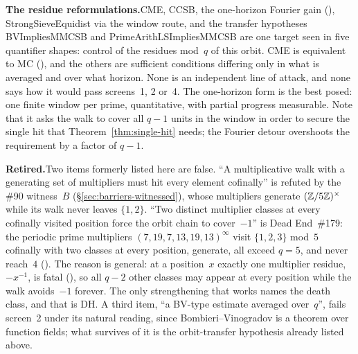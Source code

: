 \begin{frontierbox}[title={\sffamily\bfseries The ladder, and what a route must pass}]
\smallskip
\textbf{The residue reformulations.}\enspace CME, CCSB, the one-horizon
Fourier gain
(),
StrongSieveEquidist via the window route, and the transfer hypotheses
BVImpliesMMCSB and PrimeArithLSImpliesMMCSB are one target seen in five
quantifier shapes: control of the residues mod~$q$ of this orbit.  CME
is equivalent to MC (), and
the others are sufficient conditions differing only in what is averaged
and over what horizon.  None is an independent line of attack, and none
says how it would pass screens~1, 2 or~4.  The one-horizon form is the
best posed: one finite window per prime, quantitative, with partial
progress measurable.  Note that it asks the walk to cover all $q-1$
units in the window in order to secure the single hit that
Theorem~\ref{thm:single-hit} needs; the Fourier detour overshoots the
requirement by a factor of $q-1$.

\smallskip
\textbf{Retired.}\enspace Two items formerly listed here are false.
``A multiplicative walk with a generating set of multipliers must hit
every element cofinally'' is refuted by the \#90 witness~$B$
(\S\ref{sec:barriers-witnessed}), whose multipliers generate
$(\mathbb{Z}/5\mathbb{Z})^\times$ while its walk never leaves $\{1,2\}$.  ``Two
distinct multiplier classes at every cofinally visited position force
the orbit chain to cover~$-1$'' is Dead End~\#179: the periodic prime
multipliers $(7,19,7,13,19,13)^\infty$ visit $\{1,2,3\}$ mod~$5$
cofinally with two classes at every position, generate, all
exceed $q=5$, and never reach~$4$
().  The
reason is general: at a position~$x$ exactly one multiplier residue,
$-x^{-1}$, is fatal
(), so all
$q-2$ other classes may appear at every position while the walk
avoids~$-1$ forever.  The only strengthening that works names the death
class, and that is DH\@.  A third item, ``a BV-type estimate averaged
over~$q$'', fails screen~2 under its natural reading, since
Bombieri--Vinogradov is a theorem over function fields; what survives
of it is the orbit-transfer hypothesis already listed above.
\end{frontierbox}

